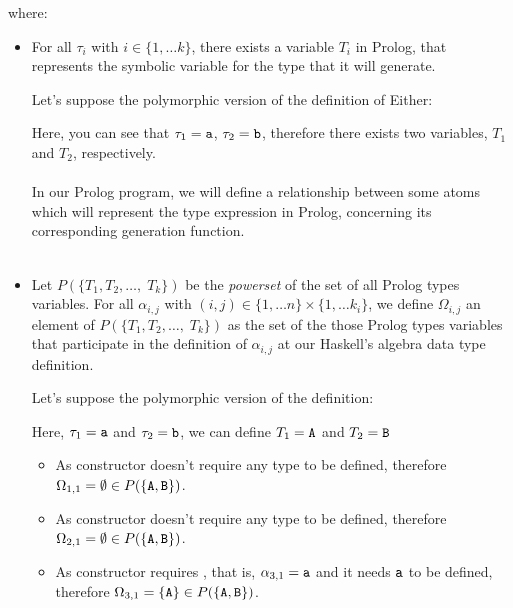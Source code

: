 	where:
	\begin{itemize}
		\item For all $\tau_i$ with $i \in \{1, \ldots k \}$, there exists a variable $T_i$ in Prolog, that represents the symbolic variable for the type that it will generate.
		      \begin{example}
		      	Let's suppose the polymorphic version of the definition of Either:
		      	
		      	Here, you can see that $\tau_1 = \texttt{a}$, $\tau_2 = \texttt{b}$, therefore there exists two variables, $T_1$ and $T_2$, respectively.\\\\
		      	In our Prolog program, we will define a relationship between some atoms which will represent the type expression in Prolog, concerning its corresponding generation function.\\\\
		      \end{example}
		\item Let $P(\{ T_1 , T_2, \ldots, \; T_k \})$ be the \textit{powerset} of the set of all Prolog types variables. For all $\alpha_{i,j}$ with $(i,j) \in \{1, \ldots n \} \times \{1, \ldots k_i \}$, we define $\Omega_{i,j}$ an element of $P(\{ T_1, T_2, \ldots, \; T_k \})$ as the set of the those Prolog types variables that participate in the definition of $\alpha_{i,j}$ at our Haskell's algebra data type definition.
		      \begin{example}
		      	Let's suppose the polymorphic version of the  definition:
		      	
		      	Here, $\tau_1 = \texttt{a}$ and $\tau_2=\texttt{b}$, we can define $T_1 = \texttt{A}$ and $T_2=\texttt{B}$
		      	\begin{itemize}
		      		\item As  constructor doesn't require any type to be defined, therefore $\Omega_{1,1} = \emptyset \in P(\{ \texttt{A}, \texttt{B} \})$.
		      		\item As  constructor doesn't require any type to be defined, therefore $\Omega_{2,1} = \emptyset \in P(\{ \texttt{A}, \texttt{B} \})$.
		      		\item As  constructor requires , that is, $\alpha_{3,1} = \texttt{a}$ and it needs $\texttt{a}$ to be defined, therefore $\Omega_{3,1} = \{\texttt{A}\} \in P(\{ \texttt{A} , \texttt{B} \})$.

\end{itemize}
\end{example}
\end{itemize}
